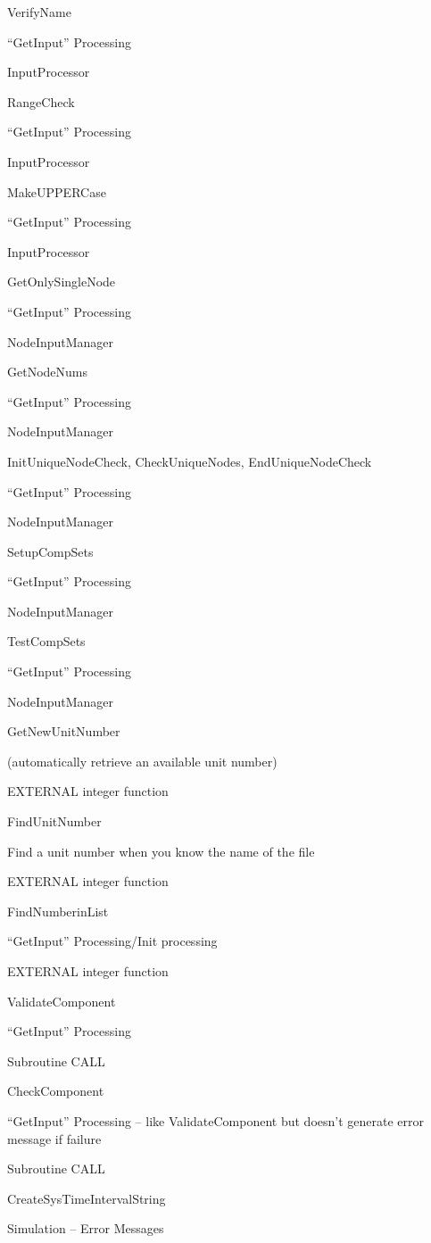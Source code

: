 VerifyName

``GetInput'' Processing

InputProcessor

RangeCheck

``GetInput'' Processing

InputProcessor

MakeUPPERCase

``GetInput'' Processing

InputProcessor

GetOnlySingleNode

``GetInput'' Processing

NodeInputManager

GetNodeNums

``GetInput'' Processing

NodeInputManager

InitUniqueNodeCheck, CheckUniqueNodes, EndUniqueNodeCheck

``GetInput'' Processing

NodeInputManager

SetupCompSets

``GetInput'' Processing

NodeInputManager

TestCompSets

``GetInput'' Processing

NodeInputManager

GetNewUnitNumber

(automatically retrieve an available unit number)

EXTERNAL integer function

FindUnitNumber

Find a unit number when you know the name of the file

EXTERNAL integer function

FindNumberinList

``GetInput'' Processing/Init processing

EXTERNAL integer function

ValidateComponent

``GetInput'' Processing

Subroutine CALL

CheckComponent

``GetInput'' Processing -- like ValidateComponent but doesn't generate error message if failure

Subroutine CALL

CreateSysTimeIntervalString

Simulation -- Error Messages

